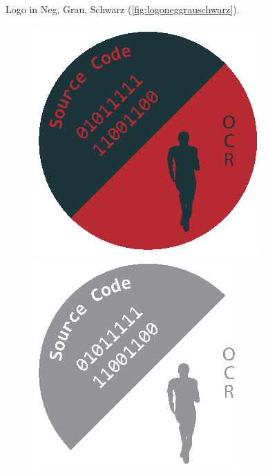 Logo in Neg, Grau, Schwarz (\autoref{fig:logoneggrauschwarz}).
%
\begin{figure}[!hb]%
	\centering
	\begin{minipage}[b]{0.40\textwidth}
		\includegraphics[width=\textwidth]{images/Logo-negativ.eps}%
	\end{minipage}
	\hfill
	\begin{minipage}[b]{0.30\textwidth}
		\includegraphics[width=\textwidth]{images/Logo-Grau.eps}%

\end{minipage}
\end{figure}
